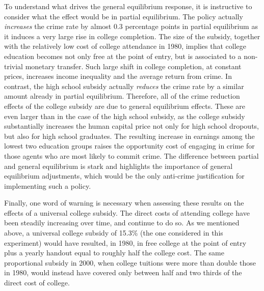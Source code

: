 \documentclass[a4paper,dvips,12pt]{article}
\begin{document}
To understand what drives the general equilibrium response, it is instructive to consider what the effect would be in partial equilibrium. The policy actually \emph{increases} the crime rate by almost 0.3 percentage points in partial equilibrium as it induces a very large rise in college completion. The size of the subsidy, together with the relatively low cost of college attendance in 1980, implies that college education becomes not only free at the point of entry, but is associated to a non-trivial monetary transfer. Such large shift in college completion, at constant prices, increases income inequality and the average return from crime. In contrast, the high school subsidy actually \emph{reduces} the crime rate by a similar amount already in partial equilibrium. Therefore, all of the crime reduction effects of the college subsidy are due to general equilibrium effects. These are even larger than in the case of the high school subsidy, as the college subsidy substantially increases the human capital price not only for high school dropouts, but also for high school graduates. The resulting increase in earnings among the lowest two education groups raises the opportunity cost of engaging in crime for those agents who are most likely to commit crime. The difference between partial and general equilibrium is stark and highlights the importance of general equilibrium adjustments, which would  be the only anti-crime justification for implementing such a policy.

Finally, one word of warning is necessary when assessing these results on the effects of a universal college subsidy. The direct costs of attending college have been steadily increasing over time, and continue to do so. As we mentioned above, a universal college subsidy of 15.3\% (the one considered in this experiment) would have resulted, in 1980, in free college at the point of entry plus a yearly handout equal to roughly half the college cost. The same proportional subsidy in 2000, when college tuitions were more than double those in 1980, would instead have covered only between half and two thirds of the direct cost of college.
\end{document}
